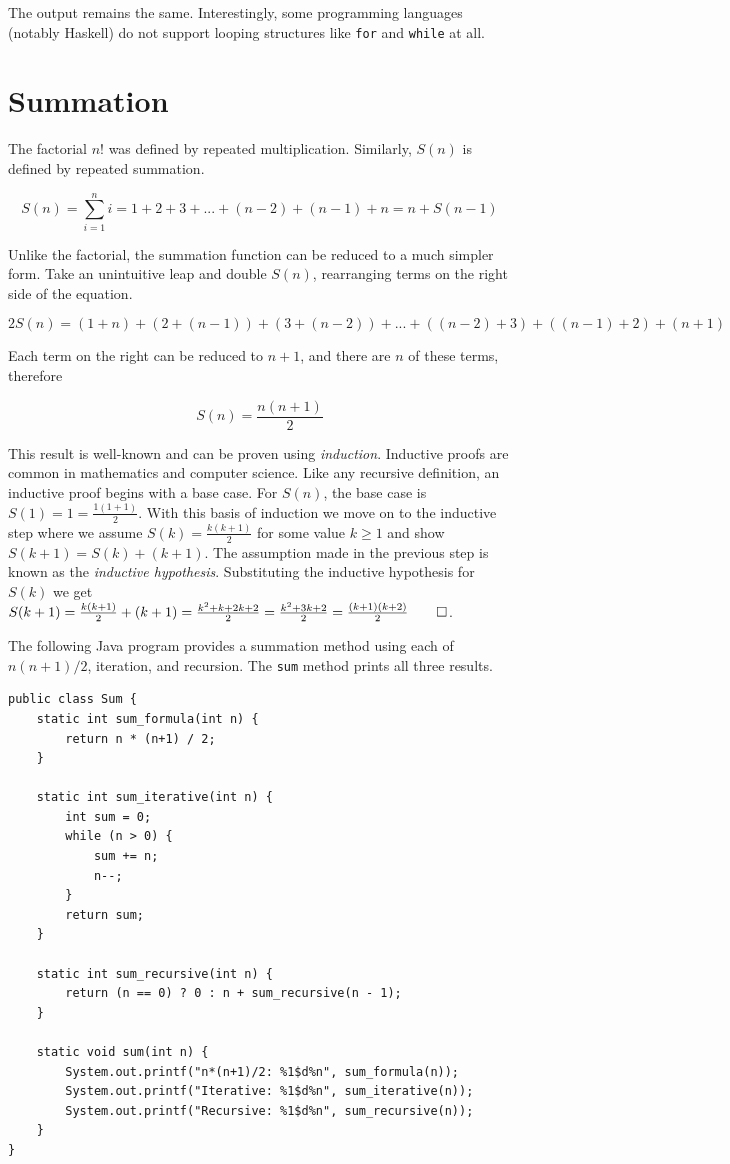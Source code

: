 \documentclass{book}
\begin{document}
The output remains the same. Interestingly, some programming languages (notably Haskell) do not support looping structures like \texttt{for} and \texttt{while} at all.

\section{Summation}

The factorial $n!$ was defined by repeated multiplication. Similarly, $S(n)$ is defined by repeated summation.

\begin{equation*}
S(n) = \sum_{i=1}^{n} i = 1 + 2 + 3 + ... + (n-2) + (n-1) + n = n + S(n-1)
\end{equation*}

Unlike the factorial, the summation function can be reduced to a much simpler form. Take an unintuitive leap and double $S(n)$, rearranging terms on the right side of the equation.

\begin{equation*}
2S(n) = (1 + n) + (2 + (n-1)) + (3 + (n-2)) + ... + ((n-2) + 3) + ((n-1) + 2) + (n + 1)
\end{equation*}

Each term on the right can be reduced to $n+1$, and there are $n$ of these terms, therefore

\begin{equation*}
S(n) = \frac{n(n+1)}{2}
\end{equation*}

This result is well-known and can be proven using \textit{induction}. Inductive proofs are common in mathematics and computer science. Like any recursive definition, an inductive proof begins with a base case. For $S(n)$, the base case is $S(1)=1=\frac{1(1+1)}{2}$. With this basis of induction we move on to the inductive step where we assume $S(k)=\frac{k(k+1)}{2}$ for some value $k \ge 1$ and show $S(k+1)=S(k)+(k+1)$. The assumption made in the previous step is known as the \textit{inductive hypothesis}. Substituting the inductive hypothesis for $S(k)$ we get $S(k+1)=\frac{k(k+1)}{2} + (k+1) = \frac{k^2 + k + 2k + 2}{2} = \frac{k^2 + 3k + 2}{2} = \frac{(k+1)(k+2)}{2} \qed$.

The following Java program provides a summation method using each of $n(n+1)/2$, iteration, and recursion. The \texttt{sum} method prints all three results.

\begin{lstlisting}
public class Sum {
    static int sum_formula(int n) {
        return n * (n+1) / 2;
    }
    
    static int sum_iterative(int n) {
        int sum = 0;
        while (n > 0) {
            sum += n;
            n--;
        }
        return sum;
    }
    
    static int sum_recursive(int n) {
        return (n == 0) ? 0 : n + sum_recursive(n - 1);
    }
    
    static void sum(int n) {
        System.out.printf("n*(n+1)/2: %1$d%n", sum_formula(n));
        System.out.printf("Iterative: %1$d%n", sum_iterative(n));
        System.out.printf("Recursive: %1$d%n", sum_recursive(n));
    }
}
\end{lstlisting}
\end{document}
